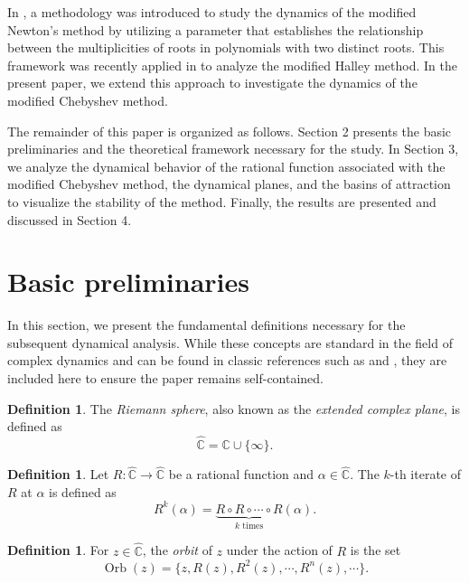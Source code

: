 \documentclass{article}
\theoremstyle{definition}
\newtheorem{definition}[theorem]{Definition}
\theoremstyle{remark}
\begin{document}
	In \cite{CECadenas2019}, a methodology was introduced to study the dynamics of the modified Newton’s method by utilizing a parameter that establishes the relationship between the multiplicities of roots in polynomials with two distinct roots. This framework was recently applied in \cite{CECadenas2023a} to analyze the modified Halley method. In the present paper, we extend this approach to investigate the dynamics of the modified Chebyshev method.

	The remainder of this paper is organized as follows. Section 2 presents the basic preliminaries and the theoretical framework necessary for the study. In Section 3, we analyze the dynamical behavior of the rational function associated with the modified Chebyshev method, the dynamical planes, and the basins of attraction to visualize the stability of the method. Finally, the results are presented and discussed in Section 4.

	\section{Basic preliminaries}

	In this section, we present the fundamental definitions necessary for the subsequent dynamical analysis. While these concepts are standard in the field of complex dynamics and can be found in classic references such as \cite{AFBeardon1991} and \cite{Urbanski2023}, they are included here to ensure the paper remains self-contained.\newpage

	\begin{definition}
		The \emph{Riemann sphere}, also known as the \emph{extended complex plane}, is defined as
		\[
		\widehat{\mathbb{C}} = \mathbb{C} \cup \{\infty\}.
		\]
	\end{definition}

\begin{definition}
	Let \( R : \widehat{\mathbb{C}} \to \widehat{\mathbb{C}} \) be a rational function and \( \alpha \in \widehat{\mathbb{C}} \). The \( k \)-th iterate of \( R \) at \( \alpha \) is defined as
	\[
	R^k(\alpha) = \underbrace{R \circ R \circ \cdots \circ R}_{k \text{ times}}(\alpha).
	\]
\end{definition}

\begin{definition}
	For \( z \in \widehat{\mathbb{C}} \), the \emph{orbit} of \( z \) under the action of \( R \) is the set
	\[
	\operatorname{Orb}(z) = \{z, R(z), R^2(z), \cdots, R^n(z), \cdots\}.
	\]
\end{definition}
\end{document}
